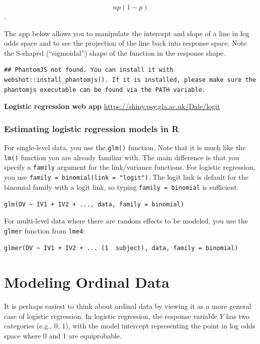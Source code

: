 \documentclass[]{book}
\begin{document}
\[np(1 - p)\].

The app below allows you to manipulate the intercept and slope of a line in log odds space and to see the projection of the line back into response space. Note the S-shaped (``sigmoidal'') shape of the function in the response shape.

\begin{verbatim}
## PhantomJS not found. You can install it with webshot::install_phantomjs(). If it is installed, please make sure the phantomjs executable can be found via the PATH variable.
\end{verbatim}

\label{fig:logit-app}\textbf{Logistic regression web app} \url{https://shiny.psy.gla.ac.uk/Dale/logit}

\hypertarget{estimating-logistic-regression-models-in-r}{%
\subsection{Estimating logistic regression models in R}\label{estimating-logistic-regression-models-in-r}}

For single-level data, you use the \texttt{glm()} function. Note that it is much like the \texttt{lm()} function you are already familiar with. The main difference is that you specify a \texttt{family} argument for the link/variance functions. For logistic regression, you use \texttt{family\ =\ binomial(link\ =\ "logit")}. The logit link is default for the binomial family with a logit link, so typing \texttt{family\ =\ binomial} is sufficient.

\texttt{glm(DV\ \textasciitilde{}\ IV1\ +\ IV2\ +\ ...,\ data,\ family\ =\ binomial)}

For multi-level data where there are random effects to be modeled, you use the \texttt{glmer} function from \texttt{lme4}:

\texttt{glmer(DV\ \textasciitilde{}\ IV1\ +\ IV2\ +\ ...\ (1\ \textbar{}\ subject),\ data,\ family\ =\ binomial)}

\hypertarget{modeling-ordinal-data}{%
\chapter{Modeling Ordinal Data}\label{modeling-ordinal-data}}

It is perhaps easiest to think about ordinal data by viewing it as a more general case of logistic regression. In logistic regression, the response variable \(Y\) has two categories (e.g., 0, 1), with the model intercept representing the point in log odds space where 0 and 1 are equiprobable.
\end{document}
